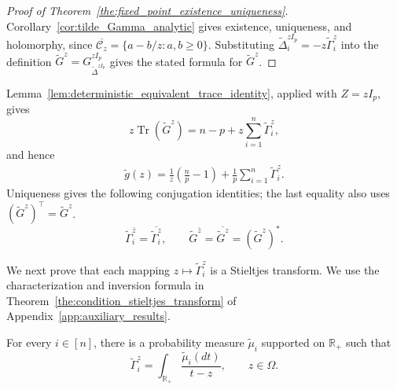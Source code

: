 \documentclass[EJP, preprint, NODS, nobera, nofontexpansion]{ejpecp}
\DeclareMathOperator{\tr}{Tr}
\begin{document}
\begin{proof}[Proof of Theorem~\ref{the:fixed_point_existence_uniqueness}]
Corollary~\ref{cor:tilde_Gamma_analytic} gives existence, uniqueness, and
holomorphy, since
$\overline{\mathcal C_z}=\{a-b/z:a,b\geq0\}$.
Substituting $\widetilde\Delta_i^{zI_p}=-z\tilde\Gamma_i^z$ into
the definition $\tilde G^z=G_{\widetilde\Delta^{zI_p}}^{zI_p}$ gives
the stated formula for $\tilde G^z$.
\end{proof}

Lemma~\ref{lem:deterministic_equivalent_trace_identity}, applied with
$Z=zI_p$, gives
\[
    z\tr(\tilde G^z)
    =n-p+z\sum_{i=1}^n\tilde\Gamma_i^z,
\]
and hence
\begin{align}\label{eq:scalar_companion_transform_identity}
    \tilde g(z)
    =\frac1z\left(\frac np-1\right)
     +\frac1p\sum_{i=1}^n\tilde\Gamma_i^z.
\end{align}
Uniqueness gives the following conjugation identities; the last
equality also uses \((\tilde G^z)^\top=\tilde G^z\).
\begin{equation}\label{eq:scalar_conjugation_identities}
    \tilde\Gamma_i^{\bar z}
    =
    \overline{\tilde\Gamma_i^z},
    \qquad
    \tilde G^{\bar z}
    =
    \overline{\tilde G^z}
    =(\tilde G^z)^*.
\end{equation}

We next prove that each mapping \(z\mapsto\tilde\Gamma_i^z\)
is a Stieltjes transform. We use the characterization
and inversion formula in
Theorem~\ref{the:condition_stieltjes_transform} of
Appendix~\ref{app:auxiliary_results}.

\begin{proposition}\label{pro:tilde_Gamma_stieltjes_transform}
For every \(i\in[n]\), there is a probability measure
\(\tilde\mu_i\) supported on \(\mathbb R_+\) such that
\[
    \tilde\Gamma_i^z
    =
    \int_{\mathbb R_+}\frac{\tilde\mu_i(dt)}{t-z},
    \qquad z\in\Omega.
\]
\end{proposition}
\end{document}
